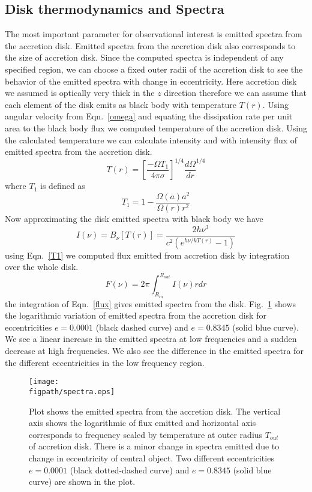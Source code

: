 \documentclass[useAMS,usenatbib]{mn2e}
\newcommand{\figpath}{./Figs/}
\begin{document}
\subsection{Disk thermodynamics and Spectra}
The most important parameter for observational interest is emitted spectra from the accretion disk. Emitted spectra from the accretion disk also corresponds to the size of accretion disk. Since the computed spectra is independent of any specified region, we can choose a fixed outer radii of the accretion disk to see the behavior of the emitted spectra with change in eccentricity. Here accretion disk we assumed is optically very thick in the $z$ direction therefore we can assume that each element of the disk emits as black body with temperature $T(r)$. Using angular velocity from Eqn.~\ref{omega} and equating the dissipation rate per unit area to the black body flux we computed temperature of the accretion disk. Using the calculated temperature we can calculate intensity and with intensity flux of emitted spectra from the accretion disk.
\begin{equation}
T(r) = \left[\frac{-\Omega T_1}{4\pi\sigma}\right]^{1/4}\frac{d\Omega}{dr}^{1/4}
\label{temp}
\end{equation}
where $T_1$ is defined as
\begin{equation}
T_1 = 1 - \frac{\Omega(a)a^2}{\Omega(r)r^2}
\label{T1}
\end{equation}
Now approximating the disk emitted spectra with black body we have
\begin{equation}
I(\nu) = B_{\nu}[T(r)] = \frac{2h\nu^3}{c^2(e^{h\nu/kT(r)} -1)}
\end{equation}
using Eqn.~\ref{T1} we computed flux emitted from accretion disk by integration over the whole disk.
\begin{equation}
F(\nu) = 2\pi\int^{R_{out}}_{R_{in}}I(\nu)rdr
\label{flux}
\end{equation}
the integration of Eqn.~\ref{flux} gives emitted spectra from the disk. Fig.~\ref{spectra} shows the logarithmic variation of emitted spectra from the accretion disk for eccentricities $e = 0.0001$ (black dashed curve) and $e = 0.8345$ (solid blue curve). We see a linear increase in the emitted spectra at low frequencies and a sudden decrease at high frequencies. We also see the difference in the emitted spectra for the different eccentricities in the low frequency region. 
\begin{figure}
\centering
\texttt{[image: \\figpath/spectra.eps]}
\caption{\small{Plot shows the emitted spectra from the accretion disk. The vertical axis shows the logarithmic of flux emitted and horizontal axis corresponds to frequency scaled by temperature at outer radius $T_{out}$ of accretion disk. There is a minor change in spectra emitted due to change in eccentricity of central object. Two different eccentricities $e = 0.0001$ (black dotted-dashed curve) and $e = 0.8345$ (solid blue curve) are shown in the plot.}}
\label{spectra}
\end{figure}
\end{document}
